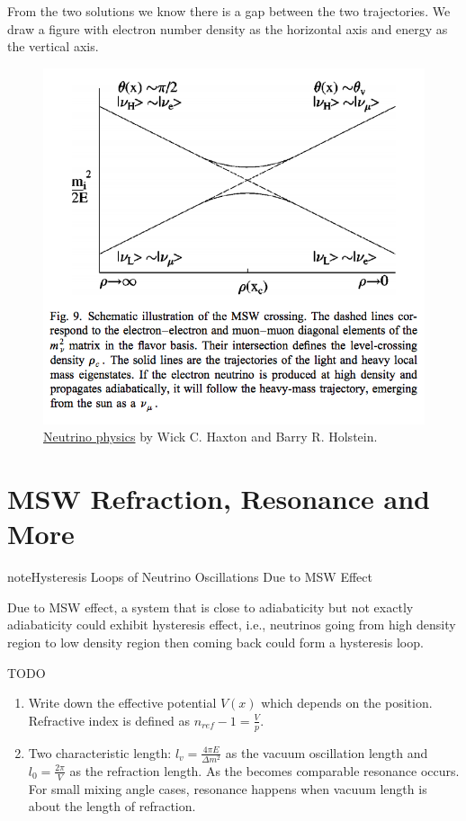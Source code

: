 \documentclass[letterpaper,12pt,english]{sphinxmanual}
\begin{document}
From the two solutions we know there is a gap between the two trajectories. We draw a figure with electron number density as the horizontal axis and energy as the vertical axis.
\begin{figure}[htbp]
\centering
\capstart

\includegraphics{msw.png}
\caption{\href{http://scitation.aip.org/content/aapt/journal/ajp/68/1/10.1119/1.19368}{Neutrino physics} by Wick C. Haxton and Barry R. Holstein.}\end{figure}


\section{MSW Refraction, Resonance and More}
\label{msw:msw-refraction-resonance-and-more}\label{msw:index-1}
\begin{notice}{note}{Hysteresis Loops of Neutrino Oscillations Due to MSW Effect}

Due to MSW effect, a system that is close to adiabaticity but not exactly adiabaticity could exhibit hysteresis effect, i.e., neutrinos going from high density region to low density region then coming back could form a hysteresis loop.
\end{notice}

TODO
\begin{enumerate}
\item {} 
Write down the effective potential \(V(x)\) which depends on the position. Refractive index is defined as \(n_{ref} - 1 = \frac{V}{p}\).

\item {} 
Two characteristic length: \(l_v = \frac{4\pi E}{ \Delta m^2 }\) as the vacuum oscillation length and \(l_0=\frac{2\pi}{V}\) as the refraction length. As the becomes comparable resonance occurs. For small mixing angle cases, resonance happens when vacuum length is about the length of refraction.

\end{enumerate}
\end{document}
